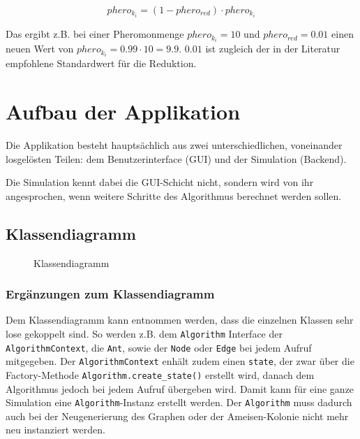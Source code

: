 \[ phero_{k_i} = (1 - phero_{red}) \cdot phero_{k_i} \]

\noindent Das ergibt z.B. bei einer Pheromonmenge $phero_{k_i} = 10$ und
$phero_{red} = 0.01$ einen neuen Wert von $phero_{k_i} = 0.99 \cdot 10 = 9.9$.
$0.01$ ist zugleich der in der Literatur empfohlene Standardwert für die
Reduktion.

\section{Aufbau der Applikation}

Die Applikation besteht hauptsächlich aus zwei unterschiedlichen, voneinander
losgelösten Teilen: dem Benutzerinterface (GUI) und der Simulation (Backend).

Die Simulation kennt dabei die GUI-Schicht nicht, sondern wird von ihr
angesprochen, wenn weitere Schritte des Algorithmus berechnet werden sollen.

\pagebreak \subsection{Klassendiagramm}

\begin{figure}[h] \centering {}
\caption{Klassendiagramm} \end{figure}

\pagebreak \subsubsection*{Ergänzungen zum Klassendiagramm}

Dem Klassendiagramm kann entnommen werden, dass die einzelnen Klassen sehr lose
gekoppelt sind. So werden z.B. dem \texttt{Algorithm} Interface der
\texttt{AlgorithmContext}, die \texttt{Ant}, sowie der \texttt{Node} oder
\texttt{Edge} bei jedem Aufruf mitgegeben. Der \texttt{AlgorithmContext} enhält
zudem einen \texttt{state}, der zwar über die Factory-Methode
\texttt{Algorithm.create\_state()} erstellt wird, danach dem Algorithmus jedoch
bei jedem Aufruf übergeben wird. Damit kann für eine ganze Simulation eine
\texttt{Algorithm}-Instanz erstellt werden. Der \texttt{Algorithm} muss dadurch
auch bei der Neugenerierung des Graphen oder der Ameisen-Kolonie nicht mehr neu
instanziert werden.

